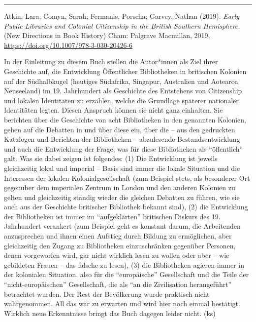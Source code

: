 \documentclass[a4paper,
fontsize=11pt,
oneside,
numbers=noperiodatend,
parskip=half-,
bibliography=totoc,
final
]{scrartcl}
\begin{document}
\begin{center}\rule{0.5\linewidth}{0.5pt}\end{center}

Atkin, Lara; Comyn, Sarah; Fermanis, Porscha; Garvey, Nathan (2019).
\emph{Early Public Libraries and Colonial Citizenship in the British
Southern Hemisphere.} (New Directions in Book History) Cham: Palgrave
Macmillan, 2019, \url{https://doi.org/10.1007/978-3-030-20426-6}

In der Einleitung zu diesem Buch stellen die Autor*innen als Ziel ihrer
Geschichte auf, die Entwicklung Öffentlicher Bibliotheken in britischen
Kolonien auf der Südhalbkugel (heutiges Südafrika, Singapur, Australien
und Aotearoa Neuseeland) im 19. Jahrhundert als Geschichte des
Entstehens von Citizenship und lokalen Identitäten zu erzählen, welche
die Grundlage späterer nationaler Identitäten legten. Diesen Anspruch
können sie nicht ganz einhalten. Sie berichten über die Geschichte von
acht Bibliotheken in den genannten Kolonien, gehen auf die Debatten in
und über diese ein, über die -- aus den gedruckten Katalogen und
Berichten der Bibliotheken -- abzulesende Bestandsentwicklung und auch
die Entwicklung der Frage, was für diese Bibliotheken als
\enquote{öffentlich} galt. Was sie dabei zeigen ist folgendes: (1) Die
Entwicklung ist jeweils gleichzeitig lokal und imperial -- Basis sind
immer die lokale Situation und die Interessen der lokalen
Kolonialgesellschaft (zum Beispiel stets, als besonderer Ort gegenüber
dem imperialen Zentrum in London und den anderen Kolonien zu gelten und
gleichzeitig ständig wieder die gleichen Debatten zu führen, wie sie
auch aus der Geschichte britischer Bibliothek bekannt sind), (2) die
Entwicklung der Bibliotheken ist immer im \enquote{aufgeklärten}
britischen Diskurs des 19. Jahrhundert verankert (zum Beispiel geht es
konstant darum, die Arbeitenden anzusprechen und ihnen einen Aufstieg
durch Bildung zu ermöglichen, aber gleichzeitig den Zugang zu
Bibliotheken einzuschränken gegenüber Personen, denen vorgeworfen wird,
gar nicht wirklich lesen zu wollen oder aber -- wie gebildeten Frauen --
das falsche zu lesen), (3) die Bibliotheken agieren immer in der
kolonialen Situation, also für die \enquote{europäische} Gesellschaft
und die Teile der \enquote{nicht-europäischen} Gesellschaft, die als
\enquote{an die Zivilisation herangeführt} betrachtet wurden. Der Rest
der Bevölkerung wurde praktisch nicht wahrgenommen. All das war zu
erwarten und wird hier noch einmal bestätigt. Wirklich neue Erkenntnisse
bringt das Buch dagegen leider nicht. (ks)
\end{document}
